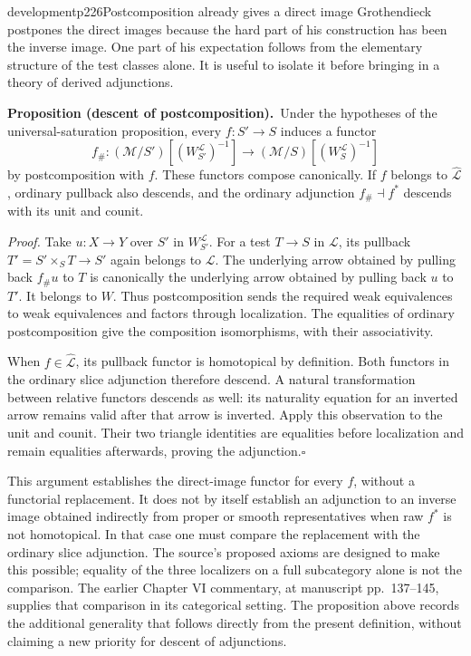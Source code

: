 \begin{dcomment}{development}{p226}{Postcomposition already gives a direct image}
Grothendieck postpones the direct images because the hard part of his construction has been the inverse image. One part of his expectation follows from the elementary structure of the test classes alone. It is useful to isolate it before bringing in a theory of derived adjunctions.

\textbf{Proposition (descent of postcomposition).}\ours\
Under the hypotheses of the universal-saturation proposition, every $f:S'\to S$ induces a functor
\[
 f_\#: (\mathcal M/S')[ (W^{\mathcal L}_{S'})^{-1}]
       \longrightarrow(\mathcal M/S)[(W^{\mathcal L}_S)^{-1}]
\]
by postcomposition with $f$. These functors compose canonically. If $f$ belongs to $\widehat{\mathcal L}$, ordinary pullback also descends, and the ordinary adjunction $f_\#\dashv f^*$ descends with its unit and counit.

\textit{Proof.} Take $u:X\to Y$ over $S'$ in $W^{\mathcal L}_{S'}$. For a test $T\to S$ in $\mathcal L$, its pullback $T'=S'\times_ST\to S'$ again belongs to $\mathcal L$. The underlying arrow obtained by pulling back $f_\#u$ to $T$ is canonically the underlying arrow obtained by pulling back $u$ to $T'$. It belongs to $W$. Thus postcomposition sends the required weak equivalences to weak equivalences and factors through localization. The equalities of ordinary postcomposition give the composition isomorphisms, with their associativity.

When $f\in\widehat{\mathcal L}$, its pullback functor is homotopical by definition. Both functors in the ordinary slice adjunction therefore descend. A natural transformation between relative functors descends as well: its naturality equation for an inverted arrow remains valid after that arrow is inverted. Apply this observation to the unit and counit. Their two triangle identities are equalities before localization and remain equalities afterwards, proving the adjunction.\hfill$\square$

This argument establishes the direct-image functor for every $f$, without a functorial replacement. It does not by itself establish an adjunction to an inverse image obtained indirectly from proper or smooth representatives when raw $f^*$ is not homotopical. In that case one must compare the replacement with the ordinary slice adjunction. The source's proposed axioms are designed to make this possible; equality of the three localizers on a full subcategory alone is not the comparison. The earlier Chapter VI commentary, at manuscript pp.~137--145, supplies that comparison in its categorical setting. The proposition above records the additional generality that follows directly from the present definition, without claiming a new priority for descent of adjunctions.
\end{dcomment}

